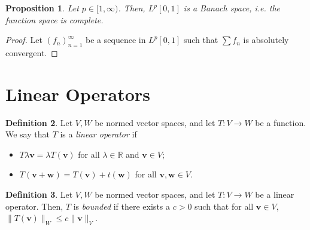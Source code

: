 \documentclass[a4paper, openany]{memoir}
\theoremstyle{definition}
\newtheorem{definition}{Definition}[section]
\theoremstyle{plain}
\newtheorem{proposition}[definition]{Proposition}
\begin{document}
    \begin{proposition}
        Let $p \in [1, \infty)$. Then, $L^p[0, 1]$ is a Banach space, i.e. the function space is complete.
    \end{proposition}
    \begin{proof}
        Let $(f_n)_{n=1}^\infty$ be a sequence in $L^p[0, 1]$ such that $\sum f_n$ is absolutely convergent.
    \end{proof}

    \newpage

    \section{Linear Operators}
    \begin{definition}
        Let $V, W$ be normed vector spaces, and let $T: V \to W$ be a function. We say that $T$ is a \emph{linear operator} if 
        \begin{itemize}
            \item $T{\lambda \bm{v}} = \lambda T(\bm{v})$ for all $\lambda \in \mathbb{R}$ and $\bm{v} \in V$;
            \item $T(\bm{v} + \bm{w}) = T(\bm{v}) + t(\bm{w})$ for all $\bm{v}, \bm{w} \in V$.
        \end{itemize}
    \end{definition}

    \begin{definition}
        Let $V, W$ be normed vector spaces, and let $T: V \to W$ be a linear operator. Then, $T$ is \emph{bounded} if there exists a $c > 0$ such that for all $\bm{v} \in V$, $\lVert T(\bm{v}) \rVert_W \leq c \lVert \bm{v} \rVert_V$.
    \end{definition}
\end{document}
